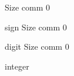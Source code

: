 \documentclass{article}
\begin{document}
\begin{grammar}

    Size comm 0
    	
    	sign
    Size comm 0
    	
    	digit
    Size comm 0
    	
    	integer
    
\end{grammar}
\end{document}
